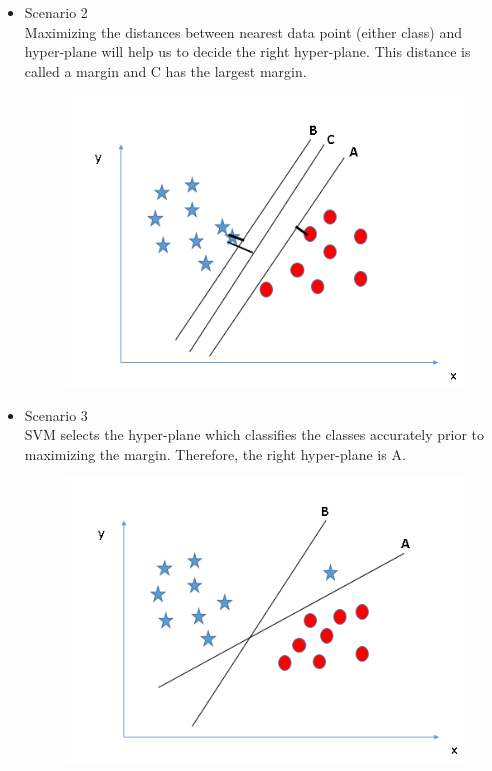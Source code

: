 \documentclass[a4paper,12pt]{report}
\begin{document}
\begin{appendices}
\begin{itemize}
\item Scenario 2 \\
Maximizing the distances between nearest data point (either class) and hyper-plane will help us to decide the right hyper-plane. This distance is called a margin and C has the largest margin. 
\begin{figure}[H]
	\centering
        \includegraphics[totalheight=4 cm]{SVM_4.png}
\end{figure}
\end{itemize}

\begin{itemize}
\item Scenario 3 \\
SVM selects the hyper-plane which classifies the classes accurately prior to maximizing the margin. Therefore, the right hyper-plane is A.
\begin{figure}[H]
	\centering
        \includegraphics[totalheight=4 cm]{SVM_5.png}
\end{figure}
\end{itemize}


\end{appendices}
\end{document}

